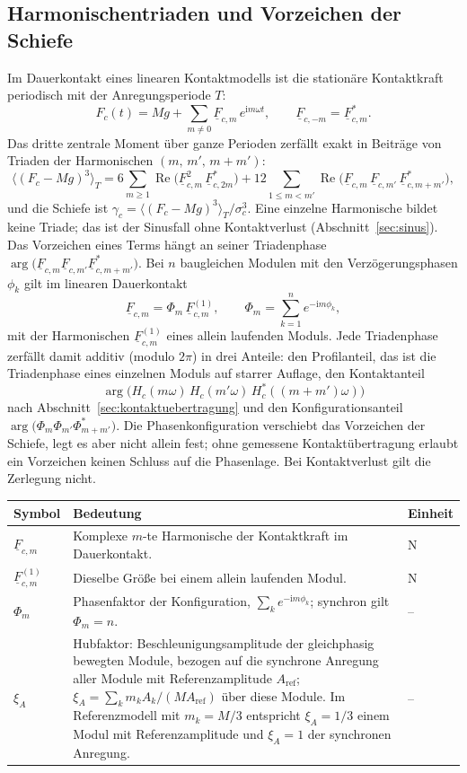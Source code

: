 \documentclass[11pt,a4paper]{article}
\makeatletter
\newenvironment{symtab}{\begin{longtable}{@{}L{.22\textwidth}L{.62\textwidth}L{.12\textwidth}@{}}\toprule\textbf{Symbol}&\textbf{Bedeutung}&\textbf{Einheit}\\\midrule\endhead}{\bottomrule\end{longtable}}
\makeatother
\begin{document}
\subsection{Harmonischentriaden und Vorzeichen der Schiefe}\label{sec:triaden}
Im Dauerkontakt eines linearen Kontaktmodells ist die stationäre Kontaktkraft periodisch mit der Anregungsperiode $T$:
\begin{equation}
F_c(t)=Mg+\sum_{m\neq0}\underline{F}_{c,m}\,e^{\mathrm i m\omega t},\qquad \underline{F}_{c,-m}=\underline{F}_{c,m}^{*}.
\end{equation}
Das dritte zentrale Moment über ganze Perioden zerfällt exakt in Beiträge von Triaden der Harmonischen $(m,\,m',\,m+m')$:
\begin{equation}
\bigl\langle(F_c-Mg)^3\bigr\rangle_T
=6\sum_{m\ge1}\operatorname{Re}\bigl(\underline{F}_{c,m}^{2}\,\underline{F}_{c,2m}^{*}\bigr)
+12\sum_{1\le m<m'}\operatorname{Re}\bigl(\underline{F}_{c,m}\,\underline{F}_{c,m'}\,\underline{F}_{c,m+m'}^{*}\bigr),
\label{eq:triaden}
\end{equation}
und die Schiefe ist $\gamma_c=\langle(F_c-Mg)^3\rangle_T/\sigma_c^3$. Eine einzelne Harmonische bildet keine Triade; das ist der Sinusfall ohne Kontaktverlust (Abschnitt~\ref{sec:sinus}). Das Vorzeichen eines Terms hängt an seiner Triadenphase $\arg\bigl(\underline{F}_{c,m}\underline{F}_{c,m'}\underline{F}_{c,m+m'}^{*}\bigr)$. Bei $n$ baugleichen Modulen mit den Verzögerungsphasen $\phi_k$ gilt im linearen Dauerkontakt
\begin{equation}
\underline{F}_{c,m}=\Phi_m\,\underline{F}^{(1)}_{c,m},\qquad \Phi_m=\sum_{k=1}^{n}e^{-\mathrm i m\phi_k},
\label{eq:phasenfaktor}
\end{equation}
mit der Harmonischen $\underline{F}^{(1)}_{c,m}$ eines allein laufenden Moduls. Jede Triadenphase zerfällt damit additiv (modulo $2\pi$) in drei Anteile: den Profilanteil, das ist die Triadenphase eines einzelnen Moduls auf starrer Auflage, den Kontaktanteil
\[
\arg\bigl(H_c(m\omega)\,H_c(m'\omega)\,H_c^{*}((m+m')\omega)\bigr)
\]
nach Abschnitt~\ref{sec:kontaktuebertragung} und den Konfigurationsanteil $\arg\bigl(\Phi_m\Phi_{m'}\Phi_{m+m'}^{*}\bigr)$. Die Phasenkonfiguration verschiebt das Vorzeichen der Schiefe, legt es aber nicht allein fest; ohne gemessene Kontakt\-übertragung erlaubt ein Vorzeichen keinen Schluss auf die Phasenlage. Bei Kontaktverlust gilt die Zerlegung nicht.
\begin{symtab}
$\underline{F}_{c,m}$&Komplexe $m$-te Harmonische der Kontaktkraft im Dauerkontakt.&N\\
$\underline{F}^{(1)}_{c,m}$&Dieselbe Größe bei einem allein laufenden Modul.&N\\
$\Phi_m$&Phasenfaktor der Konfiguration, $\sum_k e^{-\mathrm i m\phi_k}$; synchron gilt $\Phi_m=n$.&--\\
$\xi_A$&Hubfaktor: Beschleunigungsamplitude der gleichphasig bewegten Module, bezogen auf die synchrone Anregung aller Module mit Referenzamplitude $A_{\mathrm{ref}}$; $\xi_A=\sum_k m_kA_k/(MA_{\mathrm{ref}})$ über diese Module. Im Referenzmodell mit $m_k=M/3$ entspricht $\xi_A=1/3$ einem Modul mit Referenzamplitude und $\xi_A=1$ der synchronen Anregung.&--\\
\end{symtab}
\end{document}
